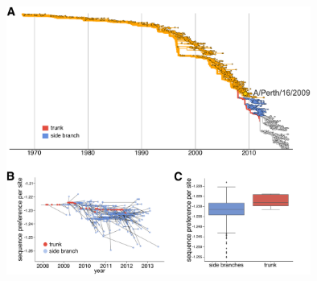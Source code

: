 \documentclass[9pt,twocolumn,twoside]{pnas-new}
\begin{document}
\begin{suppfigure}
\centerline{\includegraphics[width=0.75\textwidth]{figs/S04_post_Perth2009/post_Perth2009_seqpref.pdf}}
\caption{\label{suppfig:future}
{\bf The sequence preference of nodes that occur after the split of Perth/2009 off the trunk.}
Our experiments show a selective advantage for the trunk even if we limit the analysis to sequences that occur after the split of Perth/2009 off the trunk.
(A) Phylogenetic tree showing all nodes that branch from the trunk before or contemporaneously with Perth/2009 (orange), all nodes that occur after the branch to Perth/2009 for which we can resolve the trunk (red) or side branches (blue), and all nodes for which it is not yet clear which sequences will be on the trunk or side branches (gray).
In this figure, we restrict the analysis to the nodes in red and blue.
(B)  
Average per-site sequence preference (similar to Figure~\ref{fig:trunkvssidebranch}C) for all trunk and side-branch nodes that occur after the branch to Perth/2009.
(C)
The sequence preferences of nodes on the trunk generally exceed those of nodes on the side branches along the post-Perth/2009 portion of the tree.
Note that because there are relatively few post-Perth/2009 sequences for which we can currently distinguish trunk from side branch, the number of points in this plot is small, precluding meaningful statistical analyses of the type performed in Figure~\ref{fig:trunkvssidebranch}B.
}
\end{suppfigure}
\end{document}
